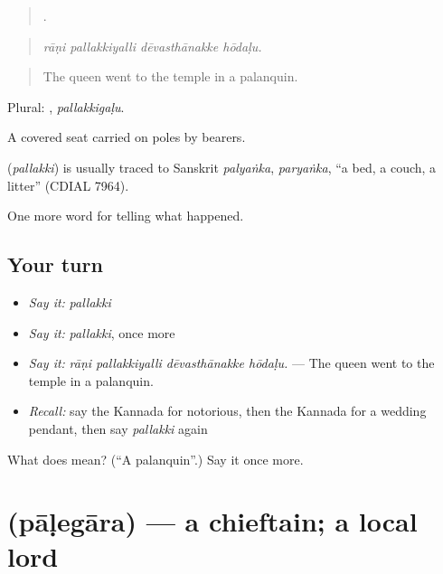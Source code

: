 \begin{quote}
   .
\end{quote}

\begin{quote}
\emph{rāṇi pallakkiyalli dēvasthānakke hōdaḷu.}
\end{quote}

\begin{quote}
The queen went to the temple in a palanquin.
\end{quote}

Plural: , \emph{pallakkigaḷu}.

A covered seat carried on poles by bearers.

\begin{cousinweb}
\textbf{} (\emph{pallakki}) is usually traced to Sanskrit \emph{palyaṅka}, \emph{paryaṅka}, \textquotedblleft{}a bed, a couch, a litter\textquotedblright{} (CDIAL 7964).
\end{cousinweb}

\begin{grammarlens}[title={What you've built}]
One more word for telling what happened.
\end{grammarlens}

\subsection*{Your turn}
\begin{itemize}
\raggedright
  \item \emph{Say it:} \emph{pallakki}
  \item \emph{Say it:} \emph{pallakki}, once more
  \item \emph{Say it:} \emph{rāṇi pallakkiyalli dēvasthānakke hōdaḷu.} — The queen went to the temple in a palanquin.
  \item \emph{Recall:} say the Kannada for notorious, then the Kannada for a wedding pendant, then say \emph{pallakki} again
\end{itemize}

\begin{tcolorbox}[breakable,colback=teal!4,colframe=teal!35!black,title={Before you move on}]
What does  mean? (\textquotedblleft{}A palanquin\textquotedblright{}.) Say it once more.
\end{tcolorbox}
\section[\texorpdfstring{\kn{ಪಾಳೆಗಾರ} (pāḷegāra)}{ಪಾಳೆಗಾರ (pāḷegāra)}]{ (pāḷegāra) — a chieftain; a local lord}

